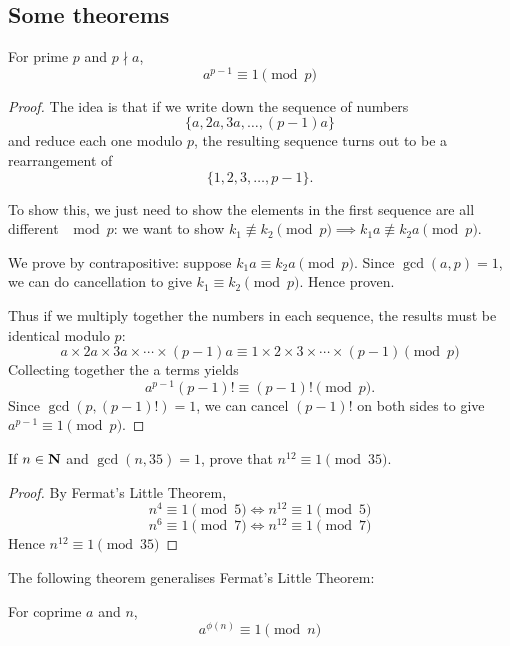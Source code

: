 \subsection{Some theorems}
\begin{theorem}
For prime $p$ and $p\nmid a$,
\begin{equation}
a^{p-1} \equiv 1 \pmod p 
\end{equation}
\end{theorem}

\begin{proof}
The idea is that if we write down the sequence of numbers
\[\{a,2a,3a,\dots,(p-1)a\}\]
and reduce each one modulo $p$, the resulting sequence turns out to be a rearrangement of
\[\{1,2,3,\dots,p-1\}.\]

To show this, we just need to show the elements in the first sequence are all different $\mod p$: we want to show $k_1\not\equiv k_2\pmod p \implies k_1a\not\equiv k_2a\pmod p$.

We prove by contrapositive: suppose $k_1a\equiv k_2a \pmod p$. Since $\gcd(a,p)=1$, we can do cancellation to give $k_1\equiv k_2\pmod p$. Hence proven.

Thus if we multiply together the numbers in each sequence, the results must be identical modulo $p$:
\[a\times 2a\times 3a\times \cdots \times (p-1)a\equiv 1\times 2\times 3\times \cdots \times (p-1) \pmod p\]
Collecting together the a terms yields
\[a^{p-1}(p-1)!\equiv (p-1)!\pmod p.\]
Since $\gcd(p,(p-1)!)=1$, we can cancel $(p-1)!$ on both sides to give $a^{p-1}\equiv 1\pmod p$.
\end{proof}

\begin{exercise}
If $n\in\mathbf N$ and $\gcd(n,35)=1$, prove that $n^{12} \equiv 1 \pmod {35}$.
\end{exercise}
\begin{proof}
By Fermat's Little Theorem,
\[n^4 \equiv 1 \pmod 5 \iff n^{12} \equiv 1 \pmod 5\]
\[n^6 \equiv 1 \pmod 7 \iff n^{12} \equiv 1 \pmod 7\]
Hence $n^{12} \equiv 1 \pmod {35}$
\end{proof}

The following theorem generalises Fermat's Little Theorem:

\begin{theorem}
For coprime $a$ and $n$, 
\begin{equation}
a^{\phi(n)} \equiv 1 \pmod n
\end{equation}
\end{theorem}
\pagebreak

